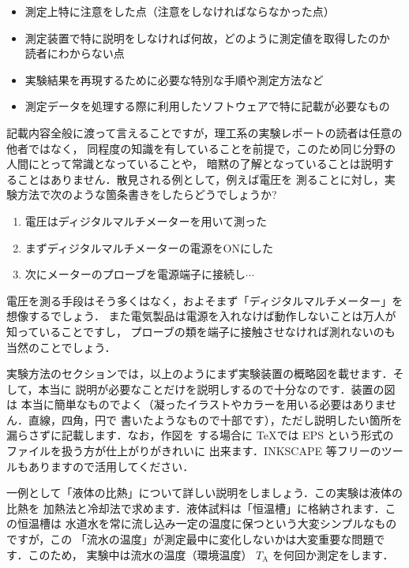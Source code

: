 \documentclass[a4paper,10pt]{jarticle}
\def\rm#1{\mathrm{#1}}
\begin{document}
%
\begin{itemize}
\setlength{\itemsep}{-2mm}
 \item 測定上特に注意をした点（注意をしなければならなかった点）
 \item 測定装置で特に説明をしなければ何故，どのように測定値を取得したのか
 	  読者にわからない点
 \item 実験結果を再現するために必要な特別な手順や測定方法など
 \item 測定データを処理する際に利用したソフトウェアで特に記載が必要なもの
\end{itemize}

記載内容全般に渡って言えることですが，理工系の実験レポートの読者は任意の他者ではなく，
同程度の知識を有していることを前提で，このため同じ分野の人間にとって常識となっていることや，
暗黙の了解となっていることは説明することはありません．散見される例として，例えば電圧を
測ることに対し，実験方法で次のような箇条書きをしたらどうでしょうか?
%
\begin{enumerate}
\setlength{\itemsep}{-2mm}
 \item 電圧はディジタルマルチメーターを用いて測った
 \item まずディジタルマルチメーターの電源をONにした
 \item 次にメーターのプローブを電源端子に接続し$\cdots$
\end{enumerate}

電圧を測る手段はそう多くはなく，およそまず「ディジタルマルチメーター」を想像するでしょう．
また電気製品は電源を入れなけば動作しないことは万人が知っていることですし，
プローブの類を端子に接触させなければ測れないのも当然のことでしょう．

実験方法のセクションでは，以上のようにまず実験装置の概略図を載せます．そして，本当に
説明が必要なことだけを説明しするので十分なのです．装置の図は
本当に簡単なものでよく（凝ったイラストやカラーを用いる必要はありません．直線，四角，円で
書いたようなもので十部です），ただし説明したい箇所を漏らさずに記載します．なお，作図を
する場合に \TeX では EPS という形式のファイルを扱う方が仕上がりがきれいに
出来ます．INKSCAPE 等フリーのツールもありますので活用してください．

\vspace{3mm}
一例として「液体の比熱」について詳しい説明をしましょう．この実験は液体の比熱を
加熱法と冷却法で求めます．液体試料は「恒温槽」に格納されます．この恒温槽は
水道水を常に流し込み一定の温度に保つという大変シンプルなものですが，この
「流水の温度」が測定最中に変化しないかは大変重要な問題です．このため，
実験中は流水の温度（環境温度） $T_\rm{A}$ を何回か測定をします．
\end{document}
